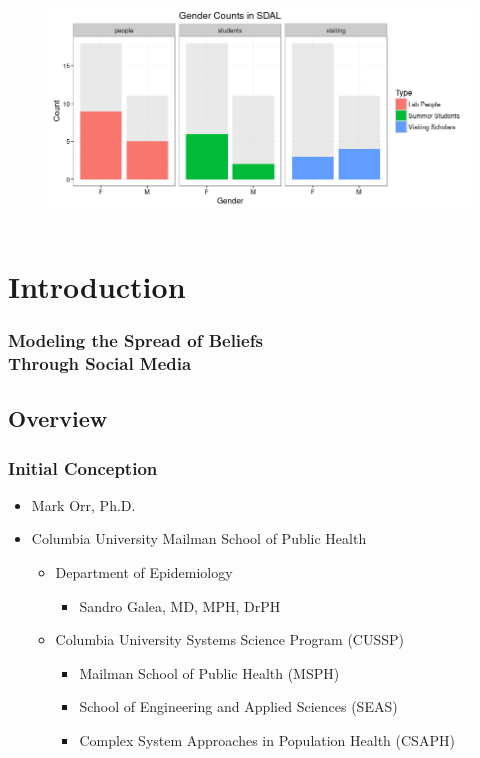 \documentclass[compress]{beamer}
\begin{document}
\begin{frame}[Blank]
\begin{columns}
			\begin{column}{0.65\textwidth}
				\begin{figure}
					\centering
					\includegraphics[width=1.0\linewidth]{../figures/sdal_gender_breakdown}
					\caption{}
					\label{fig:sdalgenderbreakdown}
					\end{figure}
			\end{column}
		\end{columns}
	\end{frame}

\section[Introduction]{Introduction}

	\begin{frame}[Section] \frametitle{\vspace{-0.2in}Modeling the Spread of Beliefs\\Through Social Media}
	\end{frame}
	
\subsection[Overview]{Overview}

\begin{frame}[Basic2] \frametitle{Initial Conception}
	\begin{itemize}
		\item Mark Orr, Ph.D.
		\item Columbia University Mailman School of Public Health
		\begin{itemize}
			\item Department of Epidemiology
			\begin{itemize}
				\item Sandro Galea, MD, MPH, DrPH
			\end{itemize}
			\item Columbia University Systems Science Program (CUSSP)
			\begin{itemize}
				\item Mailman School of Public Health (MSPH)
				\item School of Engineering and Applied Sciences (SEAS)
				\item Complex System Approaches in Population Health (CSAPH)
			\end{itemize}
		\end{itemize}
	\end{itemize}
\end{frame}
\end{document}

